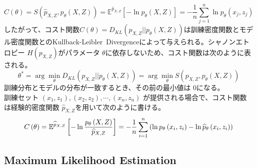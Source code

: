 \documentclass[a4paper]{jsarticle}%
\begin{document}
\begin{equation}
  \widehat{C}(\theta) = S \left(\widehat{p}_{X,Z}, p_{\theta} \left(X,Z\right)\right) = \mathbb{E}^{\widehat{p}_{X,Z}} \left[-\ln p_{\theta} \left(X,Z\right)\right] = -\dfrac{1}{n}\sum_{j=1}^{n} \ln p_{\theta} \left(x_j,z_j\right)\label{eq4}
\end{equation}
したがって、コスト関数$C \left(\theta\right) = D_{KL} \left(p_{X,Z}||p_{\theta} \left(X,Z\right)\right)$は訓練密度関数とモデル密度関数とのKullback-Leibler\ Divergenceによって与えられる。シャノンエトロピー $ H \left(p_{X,Z}\right) $がパラメータ $ \theta $に依存しないため、コスト関数は次のように表される。
$$ \theta^* = \arg\min_{\theta} D_{KL} \left(p_{X,Z}||p_{\theta} \left(X,Z\right)\right) = \arg\min_\theta S \left(p_{X,Z},p_\theta \left(X,Z\right)\right) $$
訓練分布とモデルの分布が一致するとき、その前の最小値は $ 0 $になる。\\
訓練セット $\left(x_1,z_1\right), \left(x_2,z_2\right),\cdots , \left(x_n,z_n\right)$ が提供される場合で、コスト関数は経験的密度関数 $ \widehat{p}_{X,Z} $を用いて次のように書ける。
\begin{equation}
  C \left(\theta\right) = \mathbb{E}^{\widehat{p}_{X,Z}} \left[-\ln \dfrac{p_{\theta} \left(X,Z\right)}{\widehat{p}_{X,Z}}\right] = -\dfrac{1}{n}\sum_{i=1}^{n} \left(\ln p_{\theta} \left(x_i,z_i\right) -\ln \widehat{p}_\theta \left(x_i,z_i\right) \right)\notag
\end{equation}
\pagebreak
\subsection{\textbf{Maximum Likelihood Estimation}}
\end{document}
